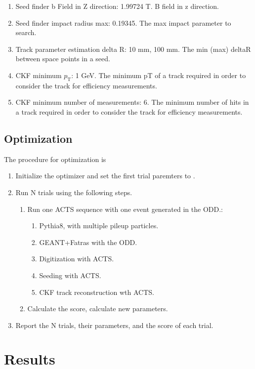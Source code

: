 \documentclass{article}
\newcommand{\pt}[0]{p_\textrm{T}}
\begin{document}
\begin{enumerate}
\item Seed finder b Field in Z direction: 1.99724 T. B field in z direction.
\item Seed finder impact radius max: 0.19345. The max impact parameter to search.
\item Track parameter estimation delta R: 10 mm, 100 mm. The min (max) deltaR between space points in a seed.
\item CKF minimum $\pt$: 1 GeV. The minimum pT of a track required in order to consider the track for efficiency measurements.
\item CKF minimum number of measurements: 6. The minimum number of hits in a track required in order to consider the track for efficiency measurements.
\end{enumerate}
\subsection{\label{b87dfa0}Optimization}
The procedure for optimization is
\begin{enumerate}
\item Initialize the optimizer and set the first trial paremters to .
\item Run N trials using the following steps.
\begin{enumerate}
\item Run one ACTS sequence with one event generated in the ODD.:
\begin{enumerate}
\item Pythia8, with multiple pileup particles.
\item GEANT+Fatras with the ODD.
\item Digitization with ACTS.
\item Seeding with ACTS.
\item CKF track reconstruction wth ACTS.
\end{enumerate}
\item Calculate the score, calculate new parameters.
\end{enumerate}
\item Report the N trials, their parameters, and the score of each trial.
\end{enumerate}
\section{Results}
\end{document}
